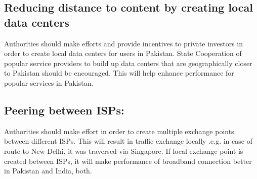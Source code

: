 \documentclass{sig-alternate-10pt}
\begin{document}
\subsection {Reducing distance to content by creating local data centers}
\indent Authorities should make efforts and provide incentives to private investors in order to create local data centers for users in Pakistan. State Cooperation of popular service providers to build up data centers that are geographically closer to Pakistan should be encouraged. This will help enhance performance for popular services in Pakistan.
\subsection {Peering between ISPs:}
 \indent Authorities should make effort in order to create multiple exchange points between different ISPs. This will result in traffic exchange locally .e.g. in case of route to New Delhi, it was traversed via Singapore. If local exchange point is created between ISPs, it will make performance of broadband connection better in Pakistan and India, both.
\end{document}
